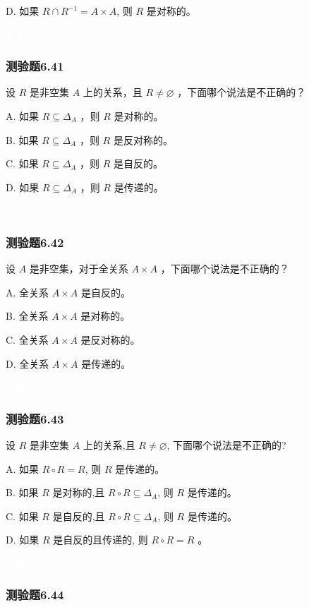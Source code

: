 \documentclass[UTF8, heading=true]{ctexart}
\begin{document}
D. 如果 $R \cap R^{-1}=A \times A$, 则 $R$ 是对称的。

\textcolor{white}{答案：C}

\subsubsection{测验题6.41}

设 $R$ 是非空集 $A$ 上的关系，且 $R \neq \varnothing$ ，下面哪个说法是不正确的？

A. 如果 $R \subseteq \Delta_A$ ，则 $R$ 是对称的。

B. 如果 $R \subseteq \Delta_A$ ，则 $R$ 是反对称的。

C. 如果 $R \subseteq \Delta_A$ ，则 $R$ 是自反的。

D.  如果 $R \subseteq \Delta_A$ ，则 $R$ 是传递的。

\textcolor{white}{答案：C}

\subsubsection{测验题6.42}

设 $A$ 是非空集，对于全关系 $A \times A$ ，下面哪个说法是不正确的？

A. 全关系 $A \times A$ 是自反的。

B. 全关系 $A \times A$ 是对称的。

C. 全关系 $A \times A$ 是反对称的。

D.  全关系 $A \times A$ 是传递的。

\textcolor{white}{答案：C}


\subsubsection{测验题6.43}

设 $R$ 是非空集 $A$ 上的关系,且 $R \neq \varnothing$, 下面哪个说法是不正确的?

A. 
如果 $R \circ R=R$, 则 $R$ 是传递的。

B. 
如果 $R$ 是对称的,且 $R \circ R \subseteq \Delta_A$, 则 $R$ 是传递的。

C. 
如果 $R$ 是自反的,且 $R \circ R \subseteq \Delta_A$, 则 $R$ 是传递的。

D. 
如果 $R$ 是自反的且传递的, 则 $R \circ R=R$ 。

\textcolor{white}{答案：B}

\subsubsection{测验题6.44}
\end{document}

